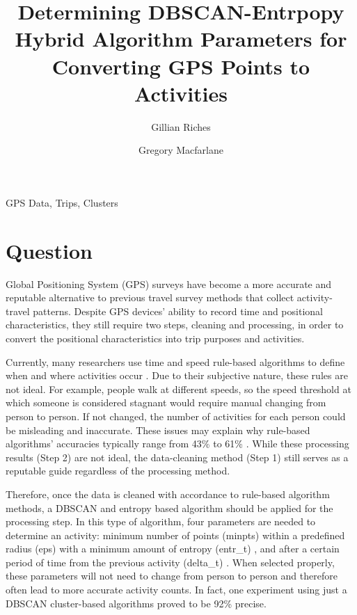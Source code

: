 \documentclass[3p, authoryear]{elsarticle} %
\begin{document}
\begin{frontmatter}

  \title{Determining DBSCAN-Entrpopy Hybrid Algorithm Parameters for Converting GPS Points to Activities}
    \author[Brigham Young University]{Gillian Riches}
    \author[Brigham Young University]{Gregory Macfarlane}
      \address[Brigham Young University]{Civil and Environmental Engineering Department, 232 Engineering Building, Provo, Utah 84602}
  
  \begin{abstract}
  
  \end{abstract}
   \begin{keyword} GPS Data, Trips, Clusters\end{keyword}
 \end{frontmatter}

\hypertarget{question}{%
\section{Question}\label{question}}

Global Positioning System (GPS) surveys have become a more accurate and reputable alternative to previous travel survey methods that collect activity-travel patterns. Despite GPS devices' ability to record time and positional characteristics, they still require two steps, cleaning and processing, in order to convert the positional characteristics into trip purposes and activities.

Currently, many researchers use time and speed rule-based algorithms to define when and where activities occur \citep{reviewOfMethods2014}. Due to their subjective nature, these rules are not ideal. For example, people walk at different speeds, so the speed threshold at which someone is considered stagnant would require manual changing from person to person. If not changed, the number of activities for each person could be misleading and inaccurate. These issues may explain why rule-based algorithms' accuracies typically range from 43\% to 61\% \citep{reviewOfMethods2014}. While these processing results (Step 2) are not ideal, the data-cleaning method (Step 1) still serves as a reputable guide regardless of the processing method.

Therefore, once the data is cleaned with accordance to rule-based algorithm methods, a DBSCAN and entropy based algorithm should be applied for the processing step. In this type of algorithm, four parameters are needed to determine an activity: minimum number of points (minpts) within a predefined radius (eps) with a minimum amount of entropy (entr\_t) \citep{GongInspiration}, and after a certain period of time from the previous activity (delta\_t) . When selected properly, these parameters will not need to change from person to person and therefore often lead to more accurate activity counts. In fact, one experiment \citep{DBAlgorithm2017} using just a DBSCAN cluster-based algorithms proved to be 92\% precise.
\end{document}
